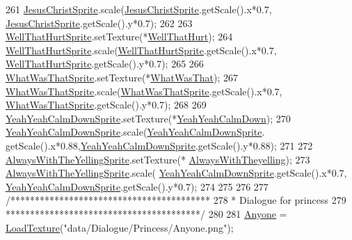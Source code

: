 \begin{DoxyCode}
261     \hyperlink{classDialogue_a878b13ffe10617ab228e8630c53dcdca}{JesusChristSprite}.scale(\hyperlink{classDialogue_a878b13ffe10617ab228e8630c53dcdca}{JesusChristSprite}.getScale().x*0.7,
      \hyperlink{classDialogue_a878b13ffe10617ab228e8630c53dcdca}{JesusChristSprite}.getScale().y*0.7);
262 
263     \hyperlink{classDialogue_acc128d221d432f840e2087c89b4e2b7b}{WellThatHurtSprite}.setTexture(*\hyperlink{classDialogue_a85a2bc7dcc0ea297684e52170f24677a}{WellThatHurt});
264     \hyperlink{classDialogue_acc128d221d432f840e2087c89b4e2b7b}{WellThatHurtSprite}.scale(\hyperlink{classDialogue_acc128d221d432f840e2087c89b4e2b7b}{WellThatHurtSprite}.getScale().x*0.7,
      \hyperlink{classDialogue_acc128d221d432f840e2087c89b4e2b7b}{WellThatHurtSprite}.getScale().y*0.7);
265 
266     \hyperlink{classDialogue_af40f2d0d2dfded21a8a5a5b62d347fb7}{WhatWasThatSprite}.setTexture(*\hyperlink{classDialogue_a94995b8fa3e4a2ab6987d05bb0070800}{WhatWasThat});
267     \hyperlink{classDialogue_af40f2d0d2dfded21a8a5a5b62d347fb7}{WhatWasThatSprite}.scale(\hyperlink{classDialogue_af40f2d0d2dfded21a8a5a5b62d347fb7}{WhatWasThatSprite}.getScale().x*0.7,
      \hyperlink{classDialogue_af40f2d0d2dfded21a8a5a5b62d347fb7}{WhatWasThatSprite}.getScale().y*0.7);
268 
269     \hyperlink{classDialogue_ad95300bae2b0ffbd0f104c1450a47f10}{YeahYeahCalmDownSprite}.setTexture(*\hyperlink{classDialogue_a76c288944980116289e0f82fe8e03cd6}{YeahYeahCalmDown});
270     \hyperlink{classDialogue_ad95300bae2b0ffbd0f104c1450a47f10}{YeahYeahCalmDownSprite}.scale(\hyperlink{classDialogue_ad95300bae2b0ffbd0f104c1450a47f10}{YeahYeahCalmDownSprite}.
      getScale().x*0.88,\hyperlink{classDialogue_ad95300bae2b0ffbd0f104c1450a47f10}{YeahYeahCalmDownSprite}.getScale().y*0.88);
271 
272     \hyperlink{classDialogue_a1eea5e12afbaad687a4eb3b17ddf1b3e}{AlwaysWithTheYellingSprite}.setTexture(*
      \hyperlink{classDialogue_a7744310841a2275354c458d8ec32463d}{AlwaysWithTheyelling});
273     \hyperlink{classDialogue_a1eea5e12afbaad687a4eb3b17ddf1b3e}{AlwaysWithTheYellingSprite}.scale(
      \hyperlink{classDialogue_ad95300bae2b0ffbd0f104c1450a47f10}{YeahYeahCalmDownSprite}.getScale().x*0.7,
      \hyperlink{classDialogue_ad95300bae2b0ffbd0f104c1450a47f10}{YeahYeahCalmDownSprite}.getScale().y*0.7);
274 
275 
276 
277     \textcolor{comment}{/*****************************************}
278 \textcolor{comment}{    * Dialogue for princess}
279 \textcolor{comment}{     ****************************************/}
280 
281     \hyperlink{classDialogue_a003a8b11f40072e6146c86c0bb68b83d}{Anyone} = \hyperlink{classDialogue_a3fb8644f167af142d1413c0fa6b74434}{LoadTexture}(\textcolor{stringliteral}{"data/Dialogue/Princess/Anyone.png"});

\end{DoxyCode}
